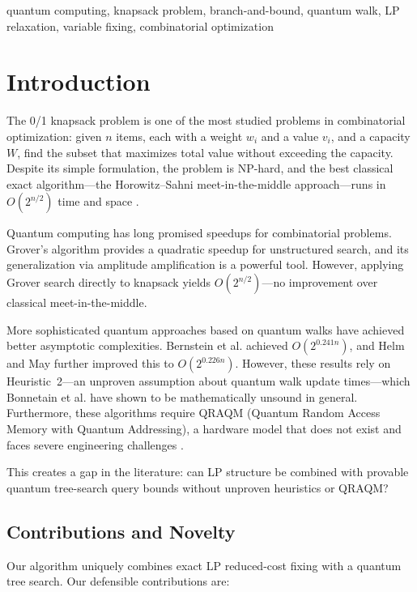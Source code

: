 \documentclass[conference]{IEEEtran}
\begin{document}
\begin{IEEEkeywords} quantum computing, knapsack problem, branch-and-bound, quantum walk, LP relaxation, variable fixing, combinatorial optimization \end{IEEEkeywords}




\section{Introduction}

The 0/1 knapsack problem is one of the most studied problems in combinatorial optimization: given $n$ items, each with a weight $w_i$ and a value $v_i$, and a capacity $W$, find the subset that maximizes total value without exceeding the capacity. Despite its simple formulation, the problem is NP-hard, and the best classical exact algorithm---the Horowitz--Sahni meet-in-the-middle approach---runs in $O(2^{n/2})$ time and space \cite{ref2}.

Quantum computing has long promised speedups for combinatorial problems. Grover's algorithm \cite{ref8} provides a quadratic speedup for unstructured search, and its generalization via amplitude amplification \cite{ref11} is a powerful tool. However, applying Grover search directly to knapsack yields $O(2^{n/2})$---no improvement over classical meet-in-the-middle.

More sophisticated quantum approaches based on quantum walks have achieved better asymptotic complexities. Bernstein et al. \cite{ref16} achieved $O(2^{0.241n})$, and Helm and May \cite{ref17} further improved this to $O(2^{0.226n})$. However, these results rely on Heuristic~2---an unproven assumption about quantum walk update times---which Bonnetain et al. \cite{bonnetain2020improved} have shown to be mathematically unsound in general. Furthermore, these algorithms require QRAQM (Quantum Random Access Memory with Quantum Addressing), a hardware model that does not exist and faces severe engineering challenges \cite{ref18}.

This creates a gap in the literature: can LP structure be combined with provable quantum tree-search query bounds without unproven heuristics or QRAQM?

\subsection{Contributions and Novelty}

Our algorithm uniquely combines exact LP reduced-cost fixing with a quantum tree search. Our defensible contributions are:
\end{document}
